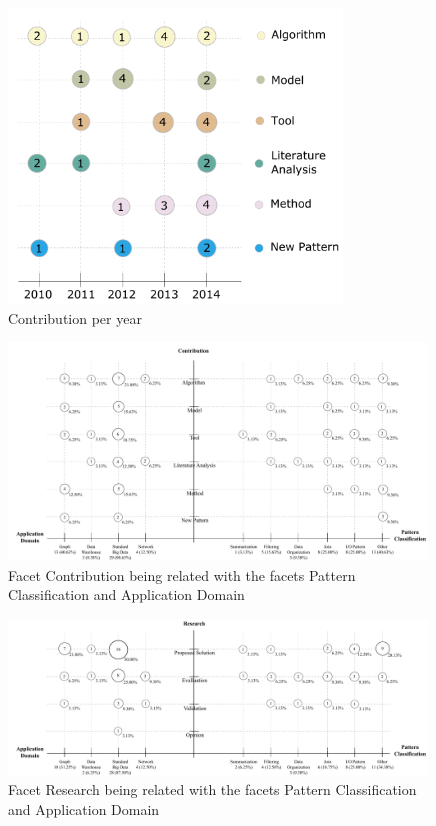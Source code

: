 \begin{figure}[hbtp]
\centering
\includegraphics[width=0.79\textwidth]{figs/ContributionPerYear.pdf}
\caption{Contribution per year}
\label{fig:contribution-per-year}
\end{figure}

\begin{figure}[hbtp]
\centering
\includegraphics[width=0.99\textwidth]{figs/Contribution-Patterns-Domain.pdf}
\caption{Facet Contribution being related with the facets Pattern
Classification and Application Domain}
\label{fig:contribution-patterns-domain}
\end{figure}

\begin{figure}[hbtp]
\centering
\includegraphics[width=0.99\textwidth]{figs/Research-Patterns-Domain.pdf}
\caption{Facet Research being related with the facets Pattern
Classification and Application Domain}
\label{fig:research-patterns-domain}
\end{figure}

